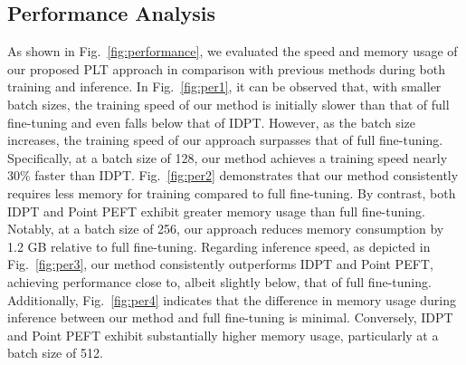 \subsection{Performance Analysis}  
As shown in Fig.~\ref{fig:performance}, we evaluated the speed and memory usage of our proposed PLT approach in comparison with previous methods during both training and inference. In Fig.~\ref{fig:per1}, it can be observed that, with smaller batch sizes, the training speed of our method is initially slower than that of full fine-tuning and even falls below that of IDPT. However, as the batch size increases, the training speed of our approach surpasses that of full fine-tuning. Specifically, at a batch size of 128, our method achieves a training speed nearly 30\% faster than IDPT. Fig.~\ref{fig:per2} demonstrates that our method consistently requires less memory for training compared to full fine-tuning. By contrast, both IDPT and Point PEFT exhibit greater memory usage than full fine-tuning. Notably, at a batch size of 256, our approach reduces memory consumption by 1.2 GB relative to full fine-tuning. Regarding inference speed, as depicted in Fig.~\ref{fig:per3}, our method consistently outperforms IDPT and Point PEFT, achieving performance close to, albeit slightly below, that of full fine-tuning. Additionally, Fig.~\ref{fig:per4} indicates that the difference in memory usage during inference between our method and full fine-tuning is minimal. Conversely, IDPT and Point PEFT exhibit substantially higher memory usage, particularly at a batch size of 512.



